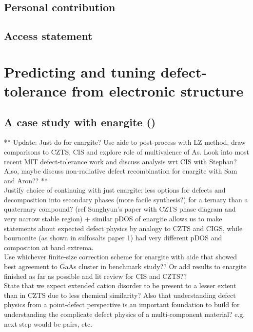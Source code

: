 \documentclass[11pt, twoside]{report}
\begin{document}


\subsection{Personal contribution}
\subsection{Access statement}


\section{Predicting and tuning defect-tolerance from electronic structure}\label{sulfosalt_defects}

\subsection{A case study with enargite ({\enargite})}

** Update: Just do for enargite? Use aide to post-process with LZ method, draw comparisons to CZTS, CIS and explore role of multivalence of As. Look into most recent MIT defect-tolerance work and discuss analysis wrt CIS with Stephan? Also, maybe discuss non-radiative defect recombination for enargite with Sam and Aron?? **\\

Justify choice of continuing with just enargite: less options for defects and decomposition into secondary phases (more facile synthesis?) for a ternary than a quaternary compound? (ref Sunghyun's paper with CZTS phase diagram and very narrow stable region) + similar pDOS of enargite allows us to make statements about expected defect physics by analogy to CZTS and CIGS, while bournonite (as shown in sulfosalts paper 1) had very different pDOS and composition at band extrema.\\

Use whichever finite-size correction scheme for enargite with aide that showed best agreement to GaAs cluster in benchmark study?? Or add results to enargite finished as far as possible and lit review for CIS and CZTS??\\

State that we expect extended cation disorder to be present to a lesser extent than in CZTS due to less chemical similarity? Also that understanding defect physics from a point-defect perspective is an important foundation to build for understanding the complicate defect physics of a multi-component material? e.g. next step would be pairs, etc.
\end{document}
